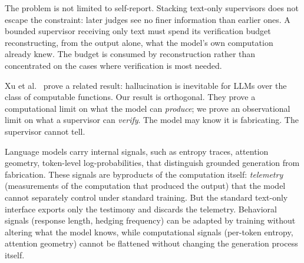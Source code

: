 The problem is not limited to self-report. Stacking text-only supervisors
does not escape the constraint: later judges see no finer information than
earlier ones. A bounded supervisor receiving only text must spend its
verification budget reconstructing, from the output alone, what the model's
own computation already knew. The budget is consumed by reconstruction
rather than concentrated on the cases where verification is most needed.


Xu et al.~\cite{xu2024hallucination} prove a related result: hallucination
is inevitable for LLMs over the class of computable functions. Our result is
orthogonal. They prove a computational limit on what the model can
\emph{produce}; we prove an observational limit on what a supervisor can
\emph{verify}. The model may know it is fabricating. The supervisor cannot
tell.


Language models carry internal signals, such as entropy traces, attention geometry,
token-level log-probabilities, that distinguish grounded generation from
fabrication. These signals are byproducts of the computation itself:
\emph{telemetry} (measurements of the computation that produced the output)
that the model cannot separately control under standard training. But the
standard text-only interface exports only the testimony and discards the
telemetry. Behavioral signals (response length, hedging frequency) can be
adapted by training without altering what the model knows, while
computational signals (per-token entropy, attention geometry) cannot be
flattened without changing the generation process itself.


